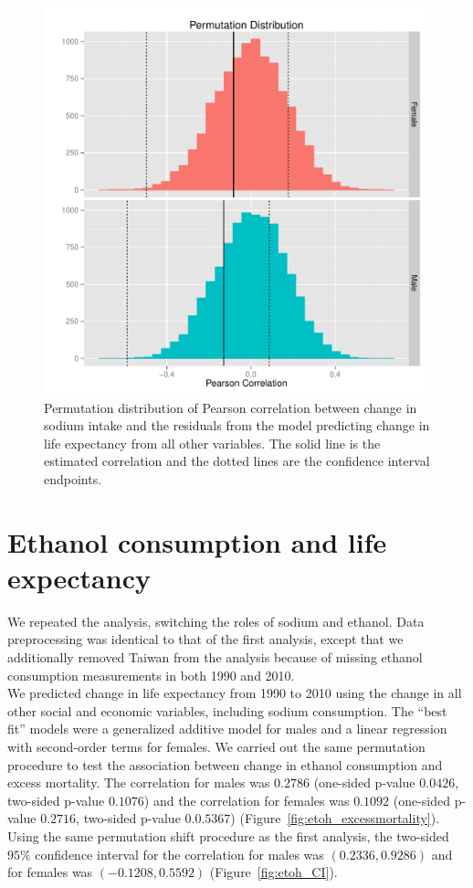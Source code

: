 \documentclass{article}
\begin{document}
\begin{figure}
\centering
\includegraphics[width = \textwidth]{permdistribution.pdf}
\caption{Permutation distribution of Pearson correlation between change in sodium intake and the residuals from the model predicting change in life expectancy from all other variables. The solid line is the estimated correlation and the dotted lines are the confidence interval endpoints.}\label{fig:sodium_CI}
\end{figure}



\section{Ethanol consumption and life expectancy}
We repeated the analysis, switching the roles of sodium and ethanol.  Data preprocessing was identical to that of the first analysis, except that we additionally removed Taiwan from the analysis because of missing ethanol consumption measurements in both 1990 and 2010.  \\

We predicted change in life expectancy from 1990 to 2010 using the change in all other social and economic variables, including sodium consumption.  The ``best fit'' models were a generalized additive model for males and a linear regression with second-order terms for females.  We carried out the same permutation procedure to test the association between change in ethanol consumption and excess mortality.  The correlation for males was $0.2786$ (one-sided p-value $0.0426$, two-sided p-value $0.1076$) and the correlation for females was $0.1092$ (one-sided p-value $0.2716$, two-sided p-value $0.0.5367$) (Figure~\ref{fig:etoh_excessmortality}). Using the same permutation shift procedure as the first analysis, the two-sided $95\%$ confidence interval for the correlation for males was $(0.2336, 0.9286)$ and for females was $(-0.1208, 0.5592)$ (Figure~\ref{fig:etoh_CI}). \\
\end{document}
